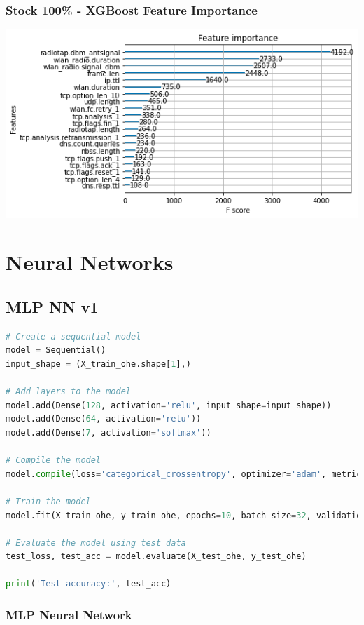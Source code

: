 \begin{appendices}
\subsubsection{Stock 100\% - XGBoost Feature Importance}
\includegraphics[width=\textwidth]{Appendices/Images/XGB/xgb_stock_100_feature_importance.png}
\newpage



\section{Neural Networks}
\label{appx: Neural Networks}

\subsection{MLP NN v1}
\label{appx: MLP NN v1}

\begin{lstlisting}[language=Python]
# Create a sequential model
model = Sequential()
input_shape = (X_train_ohe.shape[1],)

# Add layers to the model
model.add(Dense(128, activation='relu', input_shape=input_shape))
model.add(Dense(64, activation='relu'))
model.add(Dense(7, activation='softmax'))

# Compile the model
model.compile(loss='categorical_crossentropy', optimizer='adam', metrics=['accuracy'])

# Train the model
model.fit(X_train_ohe, y_train_ohe, epochs=10, batch_size=32, validation_data=(X_test_ohe, y_test_ohe))

# Evaluate the model using test data
test_loss, test_acc = model.evaluate(X_test_ohe, y_test_ohe)

print('Test accuracy:', test_acc)
\end{lstlisting}

\subsubsection{MLP Neural Network}
\label{appx: MLP NN}


\end{appendices}
